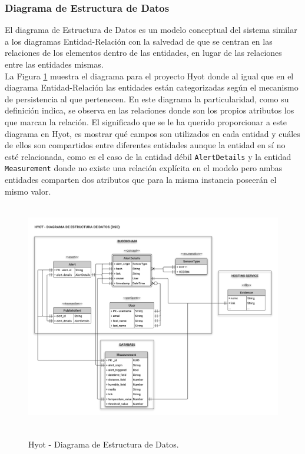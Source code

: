 \documentclass[12pt,a4paper, twoside]{report}
\begin{document}
	\subsubsection{Diagrama de Estructura de Datos}
	
	El diagrama de Estructura de Datos es un modelo conceptual del sistema similar a los diagramas Entidad-Relación con la salvedad de que se centran en las relaciones de los elementos dentro de las entidades, en lugar de las relaciones entre las entidades mismas. \\
	
	La Figura \ref{fig:design_dsd} muestra el diagrama para el proyecto Hyot donde al igual que en el diagrama Entidad-Relación las entidades están categorizadas según el mecanismo de persistencia al que pertenecen. En este diagrama la particularidad, como su definición indica, se observa en las relaciones donde son los propios atributos los que marcan la relación. El significado que se le ha querido proporcionar a este diagrama en Hyot, es mostrar qué campos son utilizados en cada entidad y cuáles de ellos son compartidos entre diferentes entidades aunque la entidad en sí no esté relacionada, como es el caso de la entidad débil \texttt{AlertDetails} y la entidad \texttt{Measurement} donde no existe una relación explícita en el modelo pero ambas entidades comparten dos atributos que para la misma instancia poseerán el mismo valor.
	
	\begin{figure}[!ht]   
		\caption{Hyot - Diagrama de Estructura de Datos.} 
		\begin{center} 
			\includegraphics[width=17cm,height=10cm]{Images/design/p_dsd} \\
			\label{fig:design_dsd} 
		\end{center}  
	\end{figure}
\end{document}
